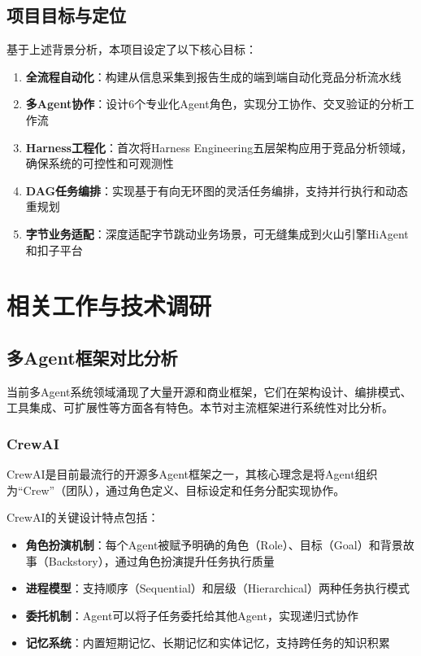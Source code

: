 \documentclass[12pt,a4paper]{ctexrep}
\begin{document}
\section{项目目标与定位}

基于上述背景分析，本项目设定了以下核心目标：

\begin{innovation}
\begin{enumerate}[leftmargin=1.5em]
\item \textbf{全流程自动化}：构建从信息采集到报告生成的端到端自动化竞品分析流水线
\item \textbf{多Agent协作}：设计6个专业化Agent角色，实现分工协作、交叉验证的分析工作流
\item \textbf{Harness工程化}：首次将Harness Engineering五层架构应用于竞品分析领域，确保系统的可控性和可观测性
\item \textbf{DAG任务编排}：实现基于有向无环图的灵活任务编排，支持并行执行和动态重规划
\item \textbf{字节业务适配}：深度适配字节跳动业务场景，可无缝集成到火山引擎HiAgent和扣子平台
\end{enumerate}
\end{innovation}

\chapter{相关工作与技术调研}

\section{多Agent框架对比分析}

当前多Agent系统领域涌现了大量开源和商业框架，它们在架构设计、编排模式、工具集成、可扩展性等方面各有特色。本节对主流框架进行系统性对比分析。

\subsection{CrewAI}

CrewAI\cite{crewai2024}是目前最流行的开源多Agent框架之一，其核心理念是将Agent组织为``Crew''（团队），通过角色定义、目标设定和任务分配实现协作。

CrewAI的关键设计特点包括：

\begin{itemize}[leftmargin=2em]
\item \textbf{角色扮演机制}：每个Agent被赋予明确的角色（Role）、目标（Goal）和背景故事（Backstory），通过角色扮演提升任务执行质量
\item \textbf{进程模型}：支持顺序（Sequential）和层级（Hierarchical）两种任务执行模式
\item \textbf{委托机制}：Agent可以将子任务委托给其他Agent，实现递归式协作
\item \textbf{记忆系统}：内置短期记忆、长期记忆和实体记忆，支持跨任务的知识积累
\end{itemize}
\end{document}
